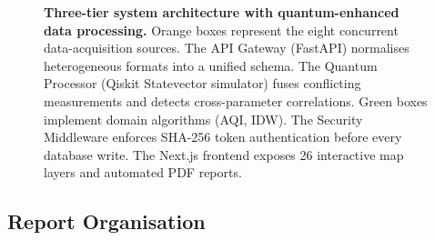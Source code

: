 \documentclass[12pt,a4paper]{article}
\begin{document}
\begin{figure}[H]
\caption[Three-tier system architecture with quantum-enhanced data processing]{%
  \textbf{Three-tier system architecture with quantum-enhanced data processing.}
  Orange boxes represent the eight concurrent data-acquisition sources.
  The API Gateway (FastAPI) normalises heterogeneous formats into a unified
  schema. The Quantum Processor (Qiskit Statevector simulator) fuses
  conflicting measurements and detects cross-parameter correlations.
  Green boxes implement domain algorithms (AQI, IDW). The Security Middleware
  enforces SHA-256 token authentication before every database write. The
  Next.js frontend exposes 26 interactive map layers and automated PDF reports.}
\label{fig:architecture}
\end{figure}

\subsection{Report Organisation}
\label{sec:intro:structure}
\end{document}
